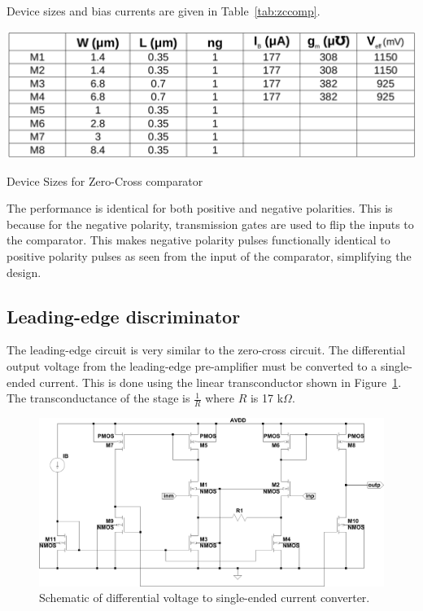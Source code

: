 \documentclass[12pt,oneside,final]{siuethesis}
\theoremstyle{definition}
\begin{document}
Device sizes and bias currents are given in Table~\ref{tab:zccomp}.

 \begin{table}[htbp!]
 \centering
 \includegraphics[scale=.35,keepaspectratio=true]{./ch3_figures/zc_cmp_sizes.png}
 \caption{Device Sizes for Zero-Cross comparator}
 \label{tab:zccomp}
\end{table}
\par The performance is identical for both positive and negative polarities. This is because for the negative polarity, transmission gates are used to flip the inputs to the comparator. This makes negative polarity pulses functionally identical to positive polarity pulses as seen from the input of the comparator, simplifying the design.

\subsection{Leading-edge discriminator}
\par The leading-edge circuit is very similar to the zero-cross circuit. The differential output voltage from the leading-edge pre-amplifier must be converted to a single-ended current. This is done using the linear transconductor shown in Figure~\ref{FIG:LE_GM}.  The transconductance of the stage is $\frac{1}{R}$ where $R$ is 17 k$\Omega$.

\begin{figure}[htbp!]
	\centering
 	\includegraphics[scale=0.55,keepaspectratio=true]{../Design_Reports/CFD_circuit_report/images/le_gm.pdf}
 	\caption{Schematic of differential voltage to single-ended current converter.}
 	\label{FIG:LE_GM}
\end{figure}
\end{document}
